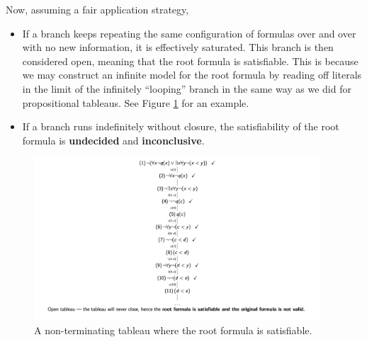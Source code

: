 Now, assuming a fair application strategy,
%
\begin{itemize}
    \item If a branch keeps repeating the same configuration of formulas over and over with no new information, it is effectively saturated. This branch is then considered open, meaning that the root formula is satisfiable. This is because we may construct an infinite model for the root formula by reading off literals in the limit of the infinitely ``looping'' branch in the same way as we did for propositional tableaus. See Figure \ref{fig:Ch04-non-terminating-tableau} for an example.
    \item If a branch runs indefinitely without closure, the satisfiability of the root formula is \textbf{undecided} and \textbf{inconclusive}.
\end{itemize}


\begin{figure}[H]
    \centering
    \includegraphics[width=0.95\textwidth]{Images/04a_NonterminatingPredicateTableau.png}
    \caption{A non-terminating tableau where the root formula is satisfiable.}
    \label{fig:Ch04-non-terminating-tableau}
\end{figure}